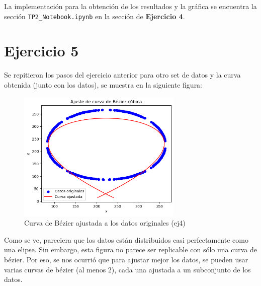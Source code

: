 \documentclass{article}
\begin{document}
La implementación para la obtención de los resultados y la gráfica se encuentra la sección \texttt{TP2_Notebook.ipynb} en la sección de \textbf{Ejercicio 4}.

\section{Ejercicio 5}
Se repitieron los pasos del ejercicio anterior para otro set de datos y la curva obtenida (junto con los datos), se muestra en la siguiente figura:

\begin{figure}[H]
    \centering
    \includegraphics[width=0.7\textwidth]{ej5.png}
    \caption{Curva de Bézier ajustada a los datos originales (ej4)}
\end{figure}

Como se ve, pareciera que los datos están distribuidos casi perfectamente como una elipse. Sin embargo, esta figura no parece ser replicable con sólo una curva de bézier. Por eso, se nos ocurrió que para ajustar mejor los datos, se pueden usar varias curvas de bézier (al menos 2), cada una ajustada a un subconjunto de los datos. 
\end{document}
